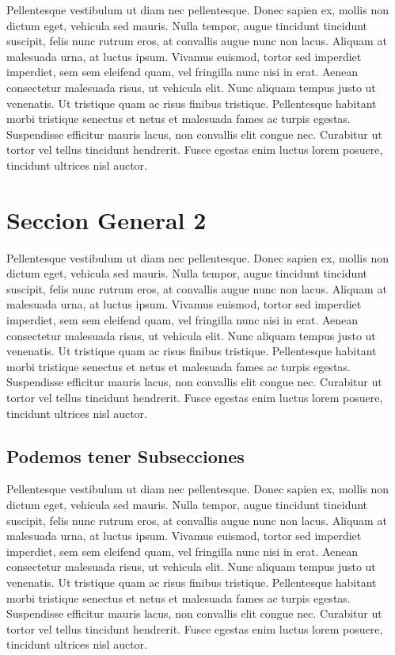 \documentclass[12pt]{article}                               %
\begin{document}
Pellentesque vestibulum ut diam nec pellentesque. Donec sapien ex, mollis non dictum eget, vehicula sed mauris. Nulla tempor, augue tincidunt tincidunt suscipit, felis nunc rutrum eros, at convallis augue nunc non lacus. Aliquam at malesuada urna, at luctus ipsum. Vivamus euismod, tortor sed imperdiet imperdiet, sem sem eleifend quam, vel fringilla nunc nisi in erat. Aenean consectetur malesuada risus, ut vehicula elit. Nunc aliquam tempus justo ut venenatis. Ut tristique quam ac risus finibus tristique. Pellentesque habitant morbi tristique senectus et netus et malesuada fames ac turpis egestas. Suspendisse efficitur mauris lacus, non convallis elit congue nec. Curabitur ut tortor vel tellus tincidunt hendrerit. Fusce egestas enim luctus lorem posuere, tincidunt ultrices nisl auctor.



\clearpage
\section{Seccion General 2}

Pellentesque vestibulum ut diam nec pellentesque. Donec sapien ex, mollis non dictum eget, vehicula sed mauris. Nulla tempor, augue tincidunt tincidunt suscipit, felis nunc rutrum eros, at convallis augue nunc non lacus. Aliquam at malesuada urna, at luctus ipsum. Vivamus euismod, tortor sed imperdiet imperdiet, sem sem eleifend quam, vel fringilla nunc nisi in erat. Aenean consectetur malesuada risus, ut vehicula elit. Nunc aliquam tempus justo ut venenatis. Ut tristique quam ac risus finibus tristique. Pellentesque habitant morbi tristique senectus et netus et malesuada fames ac turpis egestas. Suspendisse efficitur mauris lacus, non convallis elit congue nec. Curabitur ut tortor vel tellus tincidunt hendrerit. Fusce egestas enim luctus lorem posuere, tincidunt ultrices nisl auctor.


\subsection{Podemos tener Subsecciones}
Pellentesque vestibulum ut diam nec pellentesque. Donec sapien ex, mollis non dictum eget, vehicula sed mauris. Nulla tempor, augue tincidunt tincidunt suscipit, felis nunc rutrum eros, at convallis augue nunc non lacus. Aliquam at malesuada urna, at luctus ipsum. Vivamus euismod, tortor sed imperdiet imperdiet, sem sem eleifend quam, vel fringilla nunc nisi in erat. Aenean consectetur malesuada risus, ut vehicula elit. Nunc aliquam tempus justo ut venenatis. Ut tristique quam ac risus finibus tristique. Pellentesque habitant morbi tristique senectus et netus et malesuada fames ac turpis egestas. Suspendisse efficitur mauris lacus, non convallis elit congue nec. Curabitur ut tortor vel tellus tincidunt hendrerit. Fusce egestas enim luctus lorem posuere, tincidunt ultrices nisl auctor.
\cite{Sitio1}
\end{document}
